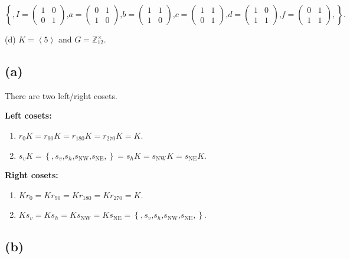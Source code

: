\[\left\{ {,I = \begin{pmatrix}
1 & 0 \\
0 & 1
\end{pmatrix}\text{,}a = \begin{pmatrix}
0 & 1 \\
1 & 0
\end{pmatrix}\text{,}b = \begin{pmatrix}
1 & 1 \\
1 & 0
\end{pmatrix}\text{,}c = \begin{pmatrix}
1 & 1 \\
0 & 1
\end{pmatrix}\text{,}d = \begin{pmatrix}
1 & 0 \\
1 & 1
\end{pmatrix}\text{,}f = \begin{pmatrix}
0 & 1 \\
1 & 1
\end{pmatrix},} \right\}.\]

(d) \(K = \left\langle 5 \right\rangle\) and \(G = \mathbb{Z}_{12}^{\times}\).

\subsection{(a)}

There are two left/right cosets.

\textbf{Left cosets:}

\begin{enumerate}
\item
  \(r_{0}K = r_{90}K = r_{180}K = r_{270}K = K\).
\item
  \(s_{v}K = \left\{ {,s_{v}\text{,}s_{h}\text{,}s_{\text{NW}}\text{,}s_{\text{NE}},} \right\} = s_{h}K = s_{\text{NW}}K = s_{\text{NE}}K\).
\end{enumerate}

\textbf{Right cosets:}

\begin{enumerate}
\item
  \(Kr_{0} = Kr_{90} = Kr_{180} = Kr_{270} = K\).
\item
  \(Ks_{v} = Ks_{h} = Ks_{\text{NW}} = Ks_{\text{NE}} = \left\{ {,s_{v}\text{,}s_{h}\text{,}s_{\text{NW}}\text{,}s_{\text{NE}},} \right\}\).
\end{enumerate}

\subsection{(b)}


